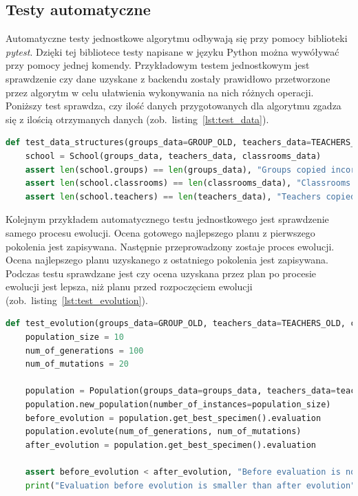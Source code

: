 	\subsection{Testy automatyczne}	
	Automatyczne testy jednostkowe algorytmu odbywają się przy pomocy biblioteki \textit{pytest}. Dzięki tej bibliotece testy napisane w języku Python można wywóływać przy pomocy jednej komendy. Przykładowym testem jednostkowym jest sprawdzenie czy dane uzyskane z backendu zostały prawidłowo przetworzone przez algorytm w celu ułatwienia wykonywania na nich różnych operacji. Poniższy test sprawdza, czy ilość danych przygotowanych dla algorytmu zgadza się z ilością otrzymanych danych (zob.~listing~\ref{lst:test_data}).
	\begin{lstlisting}[language=Python, caption=Implementacja przykładowego testu jednostkowego sprawdzającego spójność danych, label={lst:test_data}]
	def test_data_structures(groups_data=GROUP_OLD, teachers_data=TEACHERS_OLD, classrooms_data=CLASSES_OLD):
    school = School(groups_data, teachers_data, classrooms_data)
    assert len(school.groups) == len(groups_data), "Groups copied incorrectly to dict of class Group"
    assert len(school.classrooms) == len(classrooms_data), "Classrooms copied incorrectly to dict of class Classroom"
    assert len(school.teachers) == len(teachers_data), "Teachers copied incorrectly to dict of class Teacher"
\end{lstlisting}
	
	Kolejnym przykładem automatycznego testu jednostkowego jest sprawdzenie samego procesu ewolucji. Ocena gotowego najlepszego planu z pierwszego pokolenia jest zapisywana. Następnie przeprowadzony zostaje proces ewolucji. Ocena najlepszego planu uzyskanego z ostatniego pokolenia jest zapisywana. Podczas testu sprawdzane jest czy ocena uzyskana przez plan po procesie ewolucji jest lepsza, niż planu przed rozpoczęciem ewolucji (zob.~listing~\ref{lst:test_evolution}).
	
	\begin{lstlisting}[language=Python, caption=Implementacja przykładowego testu jednostkowego sprawdzającego proces ewolucji, label={lst:test_evolution}]
	def test_evolution(groups_data=GROUP_OLD, teachers_data=TEACHERS_OLD, classrooms_data=CLASSES_OLD):
    population_size = 10
    num_of_generations = 100
    num_of_mutations = 20

    population = Population(groups_data=groups_data, teachers_data=teachers_data, classrooms_data=classrooms_data)
    population.new_population(number_of_instances=population_size)
    before_evolution = population.get_best_specimen().evaluation
    population.evolute(num_of_generations, num_of_mutations)
    after_evolution = population.get_best_specimen().evaluation

    assert before_evolution < after_evolution, "Before evaluation is not smaller than after evaluation"
    print("Evaluation before evolution is smaller than after evolution")
\end{lstlisting}
	
	 

